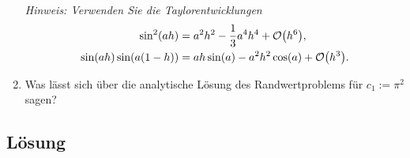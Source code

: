\documentclass{exercise}
\begin{document}
\begin{problem}
\begin{enumerate}
            \emph{Hinweis: Verwenden Sie die Taylorentwicklungen
            \begin{align*}
                \sin^2\parentheses*{ah} &= a^2 h^2 - \frac{1}{3}a^4 h^4 + \mathcal{O}\parentheses*{h^6},\\
                \sin\parentheses*{ah}\sin\parentheses*{a\parentheses*{1 - h}} &= ah\sin\parentheses*{a} - a^2 h^2 \cos\parentheses*{a} + \mathcal{O}\parentheses*{h^3}.
            \end{align*}}
            \item Was lässt sich über die analytische Lösung des Randwertproblems für \(c_1 := \pi^2\) sagen?
        \end{enumerate}
    \end{problem}
    
    \subsection*{Lösung}
\end{document}
